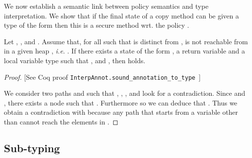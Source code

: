 \documentclass{LMCS}
\begin{document}
We now establish a semantic link between policy semantics and type
interpretation. We show that if the final state of a copy method can be given a type 
of the form  then this is a secure method wrt. the policy .

\begin{thm}
\label{th:policy-type}
Let , , and . Assume that, for all  such that  is
distinct from ,  is not reachable from  in a
given heap , \emph{i.e.} .  If there
exists a state of the form , a return variable  and a
local variable type  such that ,
 and
, then  holds.
\end{thm}
\begin{proof}

[See Coq proof \texttt{InterpAnnot.sound_annotation_to_type}~\cite{clone-webpage}]

We consider two paths  and  such that
, , ,
 and look for a contradiction. 
Since  and , there exists a
node  such that 
. Furthermore
 so we can deduce that .  Thus we
obtain a contradiction with  because any
path that starts from a variable other than  cannot reach the
elements in .
\end{proof}




\subsection{Sub-typing}
\end{document}
